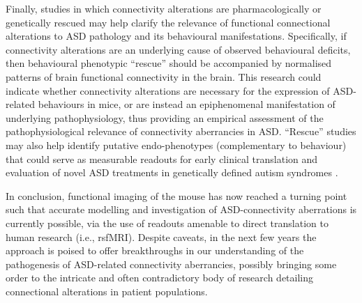 Finally, studies in which connectivity alterations are pharmacologically or
genetically rescued may help clarify the relevance of functional connectional
alterations to ASD pathology and its behavioural manifestations. Specifically,
if connectivity alterations are an underlying cause of observed behavioural
deficits, then behavioural phenotypic “rescue” should be accompanied by
normalised patterns of brain functional connectivity in the brain. This research
could indicate whether connectivity alterations are necessary for the expression
of ASD-related behaviours in mice, or are instead an epiphenomenal manifestation
of underlying pathophysiology, thus providing an empirical assessment of the
pathophysiological relevance of connectivity aberrancies in ASD. “Rescue”
studies may also help identify putative endo-phenotypes (complementary to
behaviour) that could serve as measurable readouts for early clinical
translation and evaluation of novel ASD treatments in genetically defined autism
syndromes \parencite{smucny2014}.

In conclusion, functional imaging of the mouse has now reached a turning point
such that accurate modelling and investigation of ASD-connectivity aberrations
is currently possible, via the use of readouts amenable to direct translation to
human research (i.e., rsfMRI). Despite caveats, in the next few years the
approach is poised to offer breakthroughs in our understanding of the
pathogenesis of ASD-related connectivity aberrancies, possibly bringing some
order to the intricate and often contradictory body of research detailing
connectional alterations in patient populations. 
